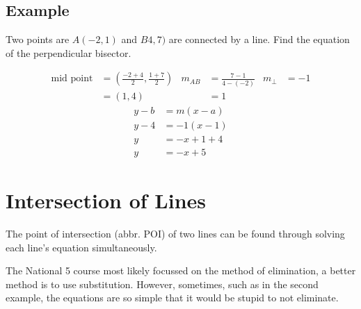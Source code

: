 \subsection{Example}
Two points are $A(-2,1)$ and $B4,7)$ are connected by a line. Find the equation of the perpendicular bisector.

\begin{align*}
	\text{mid point} &= \left(\frac{-2+4}{2},\frac{1+7}{2}\right) & m_{AB} &= \frac{7-1}{4-(-2)} & m_\perp&=-1\\
	&=(1,4) & &=1
\end{align*}
\begin{align*}
	y-b&=m(x-a)\\
	y-4&=-1(x-1)\\
	y&=-x+1+4\\
	y&=-x+5
\end{align*}


\section{Intersection of Lines}
The point of intersection (abbr. POI) of two lines can be found through solving each line's equation simultaneously.

The National 5 course most likely focussed on the method of elimination, a better method is to use substitution. However, sometimes, such as in the second example, the equations are so simple that it would be stupid to not eliminate.

